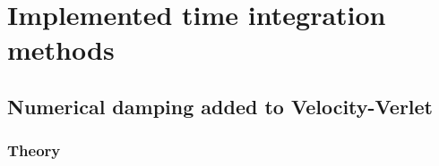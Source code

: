 % 
%               
%          
% 
\section{Implemented time integration methods}
\subsection{Numerical damping added to Velocity-Verlet}
\subsubsection{Theory}

